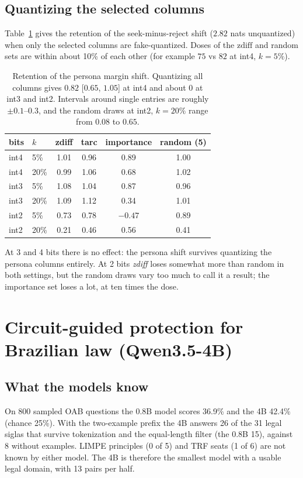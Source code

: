 \documentclass[11pt]{article}
\begin{document}
\subsection{Quantizing the selected columns}
Table~\ref{tab:quant} gives the retention of the seek-minus-reject shift ($2.82$ nats unquantized) when only the selected columns are fake-quantized. Doses of the $\text{zdiff}$ and random sets are within about 10\% of each other (for example $75$ vs $82$ at int4, $k=5\%$).
\begin{table}[h]
\centering\small
\begin{tabular}{llcccc}
\toprule
bits & $k$ & zdiff & tarc & importance & random (5)\\
\midrule
int4 & 5\%  & 1.01 & 0.96 & 0.89 & 1.00\\
int4 & 20\% & 0.99 & 1.06 & 0.68 & 1.02\\
int3 & 5\%  & 1.08 & 1.04 & 0.87 & 0.96\\
int3 & 20\% & 1.09 & 1.12 & 0.34 & 1.01\\
int2 & 5\%  & 0.73 & 0.78 & $-0.47$ & 0.89\\
int2 & 20\% & 0.21 & 0.46 & 0.56 & 0.41\\
\bottomrule
\end{tabular}
\caption{Retention of the persona margin shift. Quantizing all columns gives $0.82$ [$0.65$, $1.05$] at int4 and about $0$ at int3 and int2. Intervals around single entries are roughly $\pm0.1$--$0.3$, and the random draws at int2, $k=20\%$ range from $0.08$ to $0.65$.}
\label{tab:quant}
\end{table}
At 3 and 4 bits there is no effect: the persona shift survives quantizing the persona columns entirely. At 2 bits \emph{zdiff} loses somewhat more than random in both settings, but the random draws vary too much to call it a result; the importance set loses a lot, at ten times the dose.

\section{Circuit-guided protection for Brazilian law (Qwen3.5-4B)}
\label{sec:law}

\subsection{What the models know}
On 800 sampled OAB questions the 0.8B model scores 36.9\% and the 4B 42.4\% (chance 25\%). With the two-example prefix the 4B answers 26 of the 31 legal siglas that survive tokenization and the equal-length filter (the 0.8B 15), against
8 without examples. LIMPE principles (0 of 5) and TRF seats (1 of 6) are not known by either model. The 4B is therefore the smallest model with a usable legal domain, with 13 pairs per half.
\end{document}
